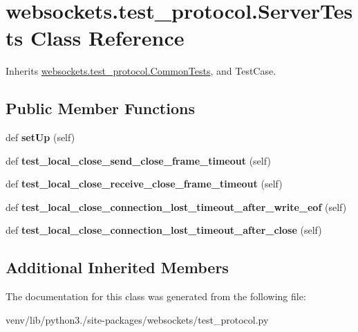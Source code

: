 \hypertarget{classwebsockets_1_1test__protocol_1_1_server_tests}{}\section{websockets.\+test\+\_\+protocol.\+Server\+Tests Class Reference}
\label{classwebsockets_1_1test__protocol_1_1_server_tests}


Inherits \hyperlink{classwebsockets_1_1test__protocol_1_1_common_tests}{websockets.\+test\+\_\+protocol.\+Common\+Tests}, and Test\+Case.

\subsection*{Public Member Functions}
\begin{DoxyCompactItemize}
\item 
\mbox{\label{classwebsockets_1_1test__protocol_1_1_server_tests_a97f287121831d4ade681734b1a21c8c2}} 
def {\bfseries set\+Up} (self)
\item 
\mbox{\label{classwebsockets_1_1test__protocol_1_1_server_tests_aed811ea66ec9a00cc919fe2c6f2b5a6d}} 
def {\bfseries test\+\_\+local\+\_\+close\+\_\+send\+\_\+close\+\_\+frame\+\_\+timeout} (self)
\item 
\mbox{\label{classwebsockets_1_1test__protocol_1_1_server_tests_a78ed1f255c6a40ef766a12e826c1dc3b}} 
def {\bfseries test\+\_\+local\+\_\+close\+\_\+receive\+\_\+close\+\_\+frame\+\_\+timeout} (self)
\item 
\mbox{\label{classwebsockets_1_1test__protocol_1_1_server_tests_a0f7c0530fb082f93e82231b1ea6fe442}} 
def {\bfseries test\+\_\+local\+\_\+close\+\_\+connection\+\_\+lost\+\_\+timeout\+\_\+after\+\_\+write\+\_\+eof} (self)
\item 
\mbox{\label{classwebsockets_1_1test__protocol_1_1_server_tests_a87492e6b1efad5ccc077398d0a4aa341}} 
def {\bfseries test\+\_\+local\+\_\+close\+\_\+connection\+\_\+lost\+\_\+timeout\+\_\+after\+\_\+close} (self)
\end{DoxyCompactItemize}
\subsection*{Additional Inherited Members}


The documentation for this class was generated from the following file\+:\begin{DoxyCompactItemize}
\item 
venv/lib/python3./site-\/packages/websockets/test\+\_\+protocol.\+py\end{DoxyCompactItemize}
